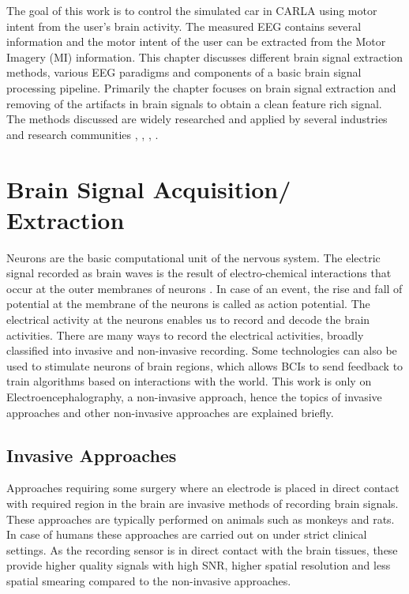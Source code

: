 The goal of this work is to control the simulated car in CARLA using motor intent from the user's brain activity. The measured EEG contains several information and the motor intent of the user can be extracted from the Motor Imagery (MI) information. This chapter discusses different brain signal extraction methods, various EEG paradigms and components of a basic brain signal processing pipeline. Primarily the chapter focuses on brain signal extraction and removing of the artifacts in brain signals to obtain a clean feature rich signal. The methods discussed are widely researched and applied by several industries and research communities \cite{2020_Survey_DL_BCI}, \cite{2022_MI_DL_Old_Survey}, \cite{2021_Book_Deep_Learning_EEG}, \cite{2013_Book_BCI_Intro}.

\section{Brain Signal Acquisition/ Extraction}
Neurons are the basic computational unit of the nervous system. The electric signal recorded as brain waves is the result of electro-chemical interactions that occur at the outer membranes of neurons \cite{2013_Book_BCI_Intro}. In case of an event, the rise and fall of potential at the membrane of the neurons is called as action potential. The electrical activity at the neurons enables us to record and decode the brain activities. There are many ways to record the electrical activities, broadly classified into invasive and non-invasive recording. Some technologies can also be used to stimulate neurons of brain regions, which allows BCIs to send feedback to train algorithms based on interactions with the world. This work is only on Electroencephalography, a non-invasive approach, hence the topics of invasive approaches and other non-invasive approaches are explained briefly.

\subsection{Invasive Approaches}
Approaches requiring some surgery where an electrode is placed in direct contact with required region in the brain are invasive methods of recording brain signals. These approaches are typically performed on animals such as monkeys and rats. In case of humans these approaches are carried out on under strict clinical settings. As the recording sensor is in direct contact with the brain tissues, these provide higher quality signals with high SNR, higher spatial resolution and less spatial smearing compared to the non-invasive approaches.

